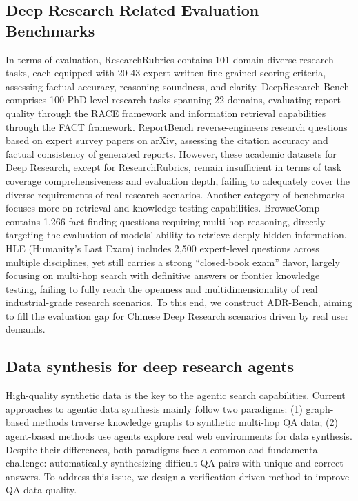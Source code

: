 \documentclass{huawei}
\begin{document}
\subsection{Deep Research Related Evaluation Benchmarks}
In terms of evaluation, ResearchRubrics contains 101 domain-diverse research tasks, each equipped with 20-43 expert-written fine-grained scoring criteria, assessing factual accuracy, reasoning soundness, and clarity. DeepResearch Bench comprises 100 PhD-level research tasks spanning 22 domains, evaluating report quality through the RACE framework and information retrieval capabilities through the FACT framework. ReportBench reverse-engineers research questions based on expert survey papers on arXiv, assessing the citation accuracy and factual consistency of generated reports. However, these academic datasets for Deep Research, except for ResearchRubrics, remain insufficient in terms of task coverage comprehensiveness and evaluation depth, failing to adequately cover the diverse requirements of real research scenarios.
Another category of benchmarks focuses more on retrieval and knowledge testing capabilities. BrowseComp contains 1,266 fact-finding questions requiring multi-hop reasoning, directly targeting the evaluation of models’ ability to retrieve deeply hidden information. HLE (Humanity’s Last Exam) includes 2,500 expert-level questions across multiple disciplines, yet still carries a strong “closed-book exam” flavor, largely focusing on multi-hop search with definitive answers or frontier knowledge testing, failing to fully reach the openness and multidimensionality of real industrial-grade research scenarios. To this end, we construct ADR-Bench, aiming to fill the evaluation gap for Chinese Deep Research scenarios driven by real user demands.


\subsection{Data synthesis for deep research agents}
High-quality synthetic data is the key to the agentic search capabilities. Current approaches to agentic data synthesis mainly follow two paradigms: (1) graph-based methods traverse knowledge graphs to synthetic multi-hop QA data; (2) agent-based methods use agents explore real web environments for data synthesis. Despite their differences, both paradigms face a common and fundamental challenge: automatically synthesizing difficult QA pairs with unique and correct answers. To address this issue, we design a verification-driven method to improve QA data quality.
\end{document}
